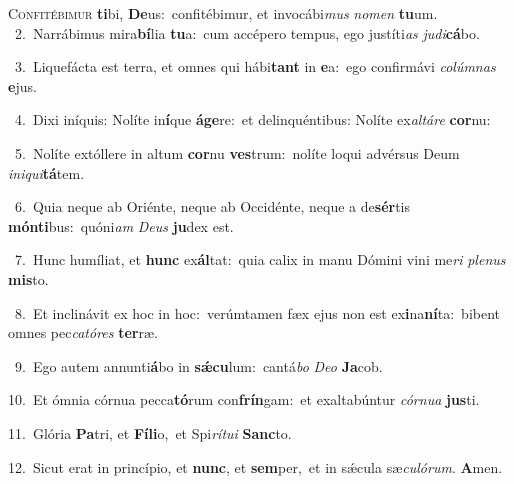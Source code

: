 \lettrine{\initial\textcolor{\initialcolor}{C}}{onfitébimur} \textbf{ti}\-bi, \textbf{De}\-us:~\star confitébimur, et invocábi\textit{mus} \textit{no}\-\textit{men} \textbf{tu}\-um.\\
{\numbfont\textcolor{\numbcolor}{~2.}}~Narrábimus mira\-\textbf{bí}\-lia \textbf{tu}\-a:~\star cum accépero tempus, ego justíti\textit{as} \textit{ju}\-\textit{di}\textbf{cá}bo.\par
{\numbfont\textcolor{\numbcolor}{~3.}}~Liquefácta est terra, et omnes qui hábi\textbf{tant} in \textbf{e}\-a:~\star ego confirmávi \textit{co}\-\textit{lúm}\textit{nas} \textbf{e}\-jus.\par
{\numbfont\textcolor{\numbcolor}{~4.}}~Dixi iníquis: Nolíte in\-\textbf{í}\-que \textbf{á}\-\textbf{ge}re:~\star et delinquéntibus: Nolíte ex\-\textit{al}\-\textit{tá}\textit{re} \textbf{cor}\-nu:\par
{\numbfont\textcolor{\numbcolor}{~5.}}~Nolíte extóllere in altum \textbf{cor}\-nu \textbf{ves}\-trum:~\star nolíte loqui advérsus Deum \textit{in}\-\textit{i}\textit{qui}\textbf{tá}tem.\par
{\numbfont\textcolor{\numbcolor}{~6.}}~Quia neque ab Oriénte, neque ab Occidénte, neque a de\-\textbf{sér}\-tis \textbf{món}\-\textbf{ti}bus:~\star quóni\textit{am} \textit{De}\-\textit{us} \textbf{ju}\-dex est.\par
{\numbfont\textcolor{\numbcolor}{~7.}}~Hunc humíliat, et \textbf{hunc} ex\-\textbf{ál}\-tat:~\star quia calix in manu Dómini vini me\textit{ri} \textit{ple}\-\textit{nus} \textbf{mis}\-to.\par
{\numbfont\textcolor{\numbcolor}{~8.}}~Et inclinávit ex hoc in hoc:~\dagger verúmtamen fæx ejus non est ex\-\textbf{i}\-na\-\textbf{ní}\-ta:~\star bibent omnes pec\-\textit{ca}\-\textit{tó}\textit{res} \textbf{ter}\-ræ.\par
{\numbfont\textcolor{\numbcolor}{~9.}}~Ego autem annunti\-\textbf{á}\-bo in \textbf{sǽ}\-\textbf{cu}lum:~\star cantá\textit{bo} \textit{De}\-\textit{o} \textbf{Ja}\-cob.\par
{\numbfont\textcolor{\numbcolor}{10.}}~Et ómnia córnua pecca\-\textbf{tó}\-rum con\-\textbf{frín}\-gam:~\star et exaltabúntur \textit{cór}\-\textit{nu}\textit{a} \textbf{jus}\-ti.\par
{\numbfont\textcolor{\numbcolor}{11.}}~Glória \textbf{Pa}\-tri, et \textbf{Fí}\-\textbf{li}o,~\star et Spi\-\textit{rí}\-\textit{tu}\textit{i} \textbf{Sanc}\-to.\par
{\numbfont\textcolor{\numbcolor}{12.}}~Sicut erat in princípio, et \textbf{nunc}\-, et \textbf{sem}\-per,~\star et in sǽcula sæ\-\textit{cu}\-\textit{ló}\textit{rum}. \textbf{A}\-men.\par
